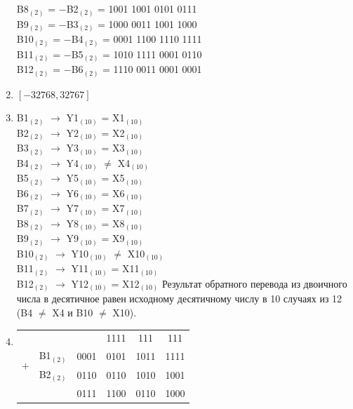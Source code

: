 \documentclass[11pt]{article}
\begin{document}
\begin{paracol}{2}
\begin{enumerate}
		B8$_{(2)}$\phantom{0} = $-$B2$_{(2)}$ = 1001 1001 0101 0111\\
		B9$_{(2)}$ \phantom{0}= $-$B3$_{(2)}$ = 1000 0011 1001 1000\\
		B10$_{(2)}$ = $-$B4$_{(2)}$ = 0001 1100 1110 1111\\
		B11$_{(2)}$ = $-$B5$_{(2)}$ = 1010 1111 0001 0110\\
		B12$_{(2)}$ = $-$B6$_{(2)}$ = 1110 0011 0001 0001
	\item $[-32768,32767]$
	\item 
		B1$_{(2)}$\phantom{0} $\rightarrow$ Y1$_{(10)}$\phantom{0} = X1$_{(10)}$\\
		B2$_{(2)}$\phantom{0} $\rightarrow$ Y2$_{(10)}$\phantom{0} = X2$_{(10)}$\\
		B3$_{(2)}$\phantom{0} $\rightarrow$ Y3$_{(10)}$\phantom{0} = X3$_{(10)}$\\
		B4$_{(2)}$\phantom{0} $\rightarrow$ Y4$_{(10)}$\phantom{0} $\neq$ X4$_{(10)}$\\
		B5$_{(2)}$\phantom{0} $\rightarrow$ Y5$_{(10)}$\phantom{0} = X5$_{(10)}$\\
		B6$_{(2)}$\phantom{0} $\rightarrow$ Y6$_{(10)}$\phantom{0} = X6$_{(10)}$\\
		B7$_{(2)}$\phantom{0} $\rightarrow$ Y7$_{(10)}$\phantom{0} = X7$_{(10)}$\\
		B8$_{(2)}$\phantom{0} $\rightarrow$ Y8$_{(10)}$\phantom{0} = X8$_{(10)}$\\
		B9$_{(2)}$\phantom{0} $\rightarrow$ Y9$_{(10)}$\phantom{0} = X9$_{(10)}$\\
		B10$_{(2)}$ $\rightarrow$ Y10$_{(10)}$ $\neq$ X10$_{(10)}$\\
		B11$_{(2)}$ $\rightarrow$ Y11$_{(10)}$ = X11$_{(10)}$\\
		B12$_{(2)}$ $\rightarrow$ Y12$_{(10)}$ = X12$_{(10)}$
	\switchcolumn
	\setcounter{enumi}{7}
		Результат обратного перевода из двоичного числа в десятичное равен исходному десятичному числу
		в 10 случаях из 12 (B4 $\neq$ X4 и B10 $\neq$ X10).\\
	\item 
		\begin{tabular}[t]{cccccc}
			&       &                                                & 1111   & \phantom{1}111 &111\phantom{1}\\
			\multirow{2}{*}{$+$} & B1$_{(2)}$ & 0001 & 0101 & 1011 & 1111\\
						          & B2$_{(2)}$ & 0110 & 0110 & 1010 &  1001\\
			\cline{2-6}
						       &        & 0111 & 1100 & 0110 & 1000\\

\end{tabular}
\end{enumerate}
\end{paracol}
\end{document}
